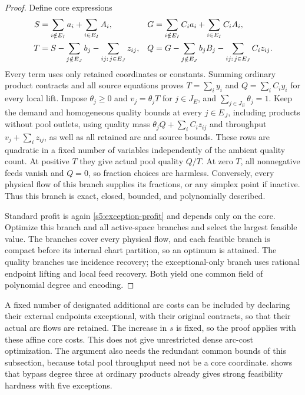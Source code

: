 \begin{proof}
Define core expressions
\begin{align}
 S&=\sum_{i\notin E_I}a_i+\sum_{i\in E_I}A_i,&
 G&=\sum_{i\notin E_I}C_i a_i+\sum_{i\in E_I}C_i A_i,\notag\\
 T&=S-\sum_{j\notin E_J}b_j-
                     \sum_{ij:\,j\in E_J}z_{ij},&
 Q&=G-\sum_{j\notin E_J}b_jB_j-
                     \sum_{ij:\,j\in E_J}C_i z_{ij}.
 \label{s5:exceptional-only-masses}
\end{align}
Every term uses only retained coordinates or constants. Summing
ordinary product contracts and all source equations proves
$T=\sum_i y_i$ and $Q=\sum_iC_i y_i$ for every local lift. Impose
$\theta_j\ge0$ and $v_j=\theta_jT$ for $j\in J_E$, and
$\sum_{j\in J_E}\theta_j=1$. Keep the demand and homogeneous quality
bounds at every $j\in E_J$, including products without pool outlets,
using quality mass
$\theta_jQ+\sum_iC_i z_{ij}$ and throughput $v_j+\sum_i z_{ij}$,
as well as all retained arc and source bounds. These rows are quadratic
in a fixed number of variables independently of the ambient quality
count. At positive $T$ they give actual pool quality $Q/T$. At zero
$T$, all nonnegative feeds vanish and $Q=0$, so fraction choices are
harmless. Conversely, every physical flow of this branch supplies its
fractions, or any simplex point if inactive. Thus this branch is exact,
closed, bounded, and polynomially described.

Standard profit is again \eqref{s5:exception-profit} and depends
only on the core. Optimize this branch and all active-space branches
and select the largest feasible value. The branches cover every physical flow,
and each feasible branch is compact before its internal chart partition,
so an optimum is attained. The quality branches use incidence recovery;
the exceptional-only branch uses rational endpoint lifting and local
feed recovery. Both yield one common field of polynomial degree and
encoding.
\end{proof}

A fixed number of designated additional arc costs can be included by
declaring their external endpoints exceptional, with their
original contracts, so that their actual arc flows are retained.
The increase in $s$ is fixed, so the proof applies with these affine
core costs. This does not give unrestricted dense arc-cost optimization.
The argument also needs the redundant common bounds of this subsection,
because total pool throughput need not be a core coordinate.
 shows that bypass degree three at ordinary products
already gives strong feasibility hardness with five exceptions.

